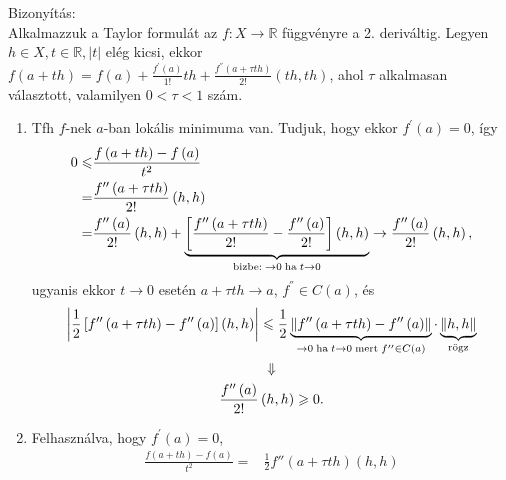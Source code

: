 \documentclass[12pt,a4paper]{scrartcl}
\providecommand{\tightlist}{%
  \setlength{\itemsep}{0pt}\setlength{\parskip}{0pt}}
\newenvironment{bizonyitas}{}{}
\begin{document}
\begin{bizonyitas}

Bizonyítás:\\
Alkalmazzuk a Taylor formulát az
\(\left. f:X\rightarrow{\mathbb{R}} \right.\) függvényre a 2.
deriváltig. Legyen \(h \in X,t \in {\mathbb{R}},\left| t \right|\) elég
kicsi, ekkor
\(f\left( {a + th} \right) = f\left( a \right) + \frac{f^{\prime}\left( a \right)}{1!}th + \frac{f^{''}\left( {a + \tau th} \right)}{2!}\left( {th,th} \right)\),
ahol \(\tau\) alkalmasan választott, valamilyen \(0 < \tau < 1\) szám.

\begin{enumerate}
\def\labelenumi{\arabic{enumi}.}
\tightlist
\item
  Tfh \(f\)-nek \(a\)-ban lokális minimuma van. Tudjuk, hogy ekkor
  \(f^{\prime}\left( a \right) = 0\), így \[\begin{aligned}
    0 \leqslant  & \frac{{f\left( {a + th} \right) - f\left( a \right)}}{{{t^2}}} \\ 
     =  & \frac{{f''\left( {a + \tau th} \right)}}{{2!}}\left( {h,h} \right) \\ 
     =  & \frac{{f''\left( a \right)}}{{2!}}\left( {h,h} \right) + \underbrace {\left[ {\frac{{f''\left( {a + \tau th} \right)}}{{2!}} - \frac{{f''\left( a \right)}}{{2!}}} \right]\left( {h,h} \right)}_{{\text{bizbe:\;}} \to 0{\text{\;ha\;}}t \to 0} \to \frac{{f''\left( a \right)}}{{2!}}\left( {h,h} \right), \\ 
  \end{aligned} \] ugyanis ekkor \(\left. t\rightarrow 0 \right.\)
  esetén \(\left. a + \tau th\rightarrow a \right.\),
  \(f^{''} \in C\left( a \right)\), és \[\begin{gathered}
    \left| {\frac{1}{2}\left[ {f''\left( {a + \tau th} \right) - f''\left( a \right)} \right]\left( {h,h} \right)} \right| \leqslant \frac{1}{2}\underbrace {\left\| {f''\left( {a + \tau th} \right) - f''\left( a \right)} \right\|}_{ \to 0{\text{\;ha\;}}t \to 0{\text{\;mert\;}}f'' \in C\left( a \right)} \cdot \underbrace {\left\| {h,h} \right\|}_{{\text{rögz}}} \\ 
     \Downarrow  \\ 
    \frac{{f''\left( a \right)}}{{2!}}\left( {h,h} \right) \geqslant 0. \\ 
  \end{gathered} \]
\item
  Felhasználva, hogy \(f^{\prime}\left( a \right) = 0\),
  \[\begin{aligned}
    \frac{{f\left( {a + th} \right) - f\left( a \right)}}{{{t^2}}} =  & \frac{1}{2}f''\left( {a + \tau th} \right)\left( {h,h} \right) \\ 

\end{aligned}\]
\end{enumerate}
\end{bizonyitas}
\end{document}
